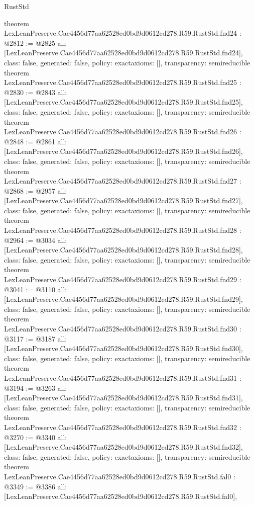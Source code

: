 \begin{lexlean}{RustStd}
\begin{coremodule}
{}
theorem LexLeanPreserve.Cae4456d77aa62528ed0bd9d0612cd278.R59.RustStd.fnd24 : @2812 := @2825 {
  all: [LexLeanPreserve.Cae4456d77aa62528ed0bd9d0612cd278.R59.RustStd.fnd24],
  class: false,
  generated: false,
  policy: exact{axioms: []},
  transparency: semireducible
}
theorem LexLeanPreserve.Cae4456d77aa62528ed0bd9d0612cd278.R59.RustStd.fnd25 : @2830 := @2843 {
  all: [LexLeanPreserve.Cae4456d77aa62528ed0bd9d0612cd278.R59.RustStd.fnd25],
  class: false,
  generated: false,
  policy: exact{axioms: []},
  transparency: semireducible
}
theorem LexLeanPreserve.Cae4456d77aa62528ed0bd9d0612cd278.R59.RustStd.fnd26 : @2848 := @2861 {
  all: [LexLeanPreserve.Cae4456d77aa62528ed0bd9d0612cd278.R59.RustStd.fnd26],
  class: false,
  generated: false,
  policy: exact{axioms: []},
  transparency: semireducible
}
theorem LexLeanPreserve.Cae4456d77aa62528ed0bd9d0612cd278.R59.RustStd.fnd27 : @2868 := @2957 {
  all: [LexLeanPreserve.Cae4456d77aa62528ed0bd9d0612cd278.R59.RustStd.fnd27],
  class: false,
  generated: false,
  policy: exact{axioms: []},
  transparency: semireducible
}
theorem LexLeanPreserve.Cae4456d77aa62528ed0bd9d0612cd278.R59.RustStd.fnd28 : @2964 := @3034 {
  all: [LexLeanPreserve.Cae4456d77aa62528ed0bd9d0612cd278.R59.RustStd.fnd28],
  class: false,
  generated: false,
  policy: exact{axioms: []},
  transparency: semireducible
}
theorem LexLeanPreserve.Cae4456d77aa62528ed0bd9d0612cd278.R59.RustStd.fnd29 : @3041 := @3110 {
  all: [LexLeanPreserve.Cae4456d77aa62528ed0bd9d0612cd278.R59.RustStd.fnd29],
  class: false,
  generated: false,
  policy: exact{axioms: []},
  transparency: semireducible
}
theorem LexLeanPreserve.Cae4456d77aa62528ed0bd9d0612cd278.R59.RustStd.fnd30 : @3117 := @3187 {
  all: [LexLeanPreserve.Cae4456d77aa62528ed0bd9d0612cd278.R59.RustStd.fnd30],
  class: false,
  generated: false,
  policy: exact{axioms: []},
  transparency: semireducible
}
theorem LexLeanPreserve.Cae4456d77aa62528ed0bd9d0612cd278.R59.RustStd.fnd31 : @3194 := @3263 {
  all: [LexLeanPreserve.Cae4456d77aa62528ed0bd9d0612cd278.R59.RustStd.fnd31],
  class: false,
  generated: false,
  policy: exact{axioms: []},
  transparency: semireducible
}
theorem LexLeanPreserve.Cae4456d77aa62528ed0bd9d0612cd278.R59.RustStd.fnd32 : @3270 := @3340 {
  all: [LexLeanPreserve.Cae4456d77aa62528ed0bd9d0612cd278.R59.RustStd.fnd32],
  class: false,
  generated: false,
  policy: exact{axioms: []},
  transparency: semireducible
}
theorem LexLeanPreserve.Cae4456d77aa62528ed0bd9d0612cd278.R59.RustStd.fal0 : @3349 := @3386 {
  all: [LexLeanPreserve.Cae4456d77aa62528ed0bd9d0612cd278.R59.RustStd.fal0],
}
\end{coremodule}
\end{lexlean}
